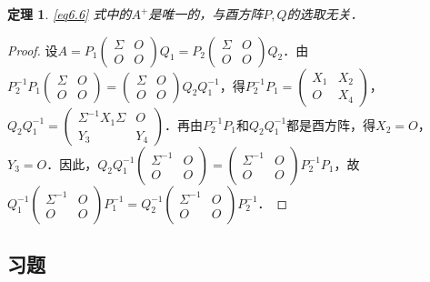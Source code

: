 \documentclass[a4paper,fontset=windows]{ctexbook}
\newtheorem{theorem}{定理}[chapter]
\theoremstyle{definition}
\begin{document}
\begin{theorem}
\eqref{eq6.6} 式中的$A^+$是唯一的，与酉方阵$P,Q$的选取无关．
\end{theorem}

\begin{proof}
设$A=P_1\begin{pmatrix}\Sigma&O \\ O&O\end{pmatrix}Q_1=P_2\begin{pmatrix}\Sigma&O \\ O&O\end{pmatrix}Q_2$．由$P_2^{-1}P_1\begin{pmatrix}\Sigma&O \\ O&O\end{pmatrix}=\begin{pmatrix}\Sigma&O \\ O&O\end{pmatrix}Q_2Q_1^{-1}$，得$P_2^{-1}P_1=\begin{pmatrix}X_1&X_2 \\ O&X_4\end{pmatrix}$，$Q_2Q_1^{-1}=\begin{pmatrix}\Sigma^{-1}X_1\Sigma&O \\ Y_3&Y_4\end{pmatrix}$．再由$P_2^{-1}P_1$和$Q_2Q_1^{-1}$都是酉方阵，得$X_2=O$，$Y_3=O$．因此，$Q_2Q_1^{-1}\begin{pmatrix}\Sigma^{-1}&O \\ O&O\end{pmatrix}=\begin{pmatrix}\Sigma^{-1}&O \\ O&O\end{pmatrix}P_2^{-1}P_1$，故$Q_1^{-1}\begin{pmatrix}\Sigma^{-1}&O \\ O&O\end{pmatrix}P_1^{-1}=Q_2^{-1}\begin{pmatrix}\Sigma^{-1}&O \\ O&O\end{pmatrix}P_2^{-1}$．
\end{proof}

\subsection*{习题}
\end{document}

